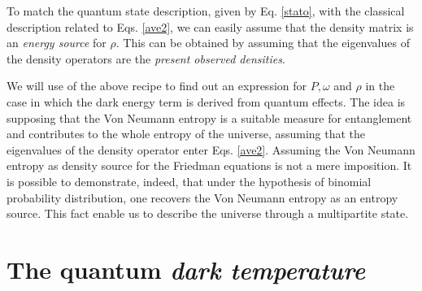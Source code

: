\documentclass[nofootinbib,prd,superscriptaddress,showpacs,showkeys,]{revtex4}
\begin{document}
To match  the  quantum state description, given by Eq. \eqref{stato}, with the classical description related to   Eqs. \eqref{ave2}, we can easily assume that the density matrix is an \emph{energy source} for $\rho$. This can be obtained by assuming that the eigenvalues of the density operators are the \emph{present observed densities}.

We will  use of the above recipe  to find out an expression for $P, \omega$ and $\rho$ in the case in which the dark energy term is derived from quantum effects. The idea is supposing that the Von Neumann entropy is a suitable measure for entanglement  and contributes to the whole entropy of the universe, assuming that the eigenvalues of the density operator enter Eqs. \eqref{ave2}. Assuming the Von Neumann entropy as density source for the Friedman equations is not a mere imposition. It is possible to  demonstrate, indeed,  that under the hypothesis of binomial probability distribution, one recovers the Von Neumann entropy as an entropy source. This fact enable us to describe the universe through a multipartite state.












\section{The quantum \emph{dark temperature}}
\end{document}

